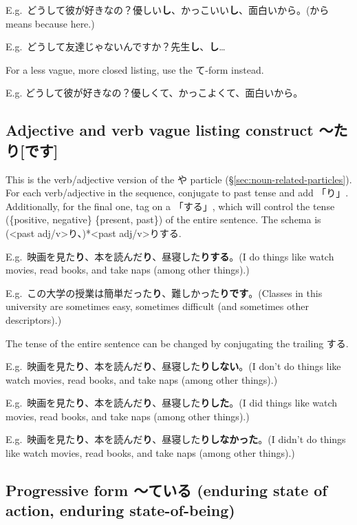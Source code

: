 \documentclass[../nihongo-gakushuu-kyouzai.tex]{subfiles}
\begin{document}
E.g.\ どうして彼が好きなの？優しい\textbf{し}、かっこいい\textbf{し}、面白いから。(から means because here.)


E.g.\ どうして友達じゃないんですか？先生\textbf{し}、\textbf{し}\dots

For a less vague, more closed listing, use the て-form instead.

E.g. どうして彼が好きなの？優しくて、かっこよくて、面白いから。

\subsection{Adjective and verb vague listing construct 〜たり[です]} \label{sec:adj-verb-vague-listing-construct}
This is the verb/adjective version of the や particle (\S\ref{sec:noun-related-particles}). For each verb/adjective in the sequence, conjugate to past tense and add 「り」. Additionally, for the final one, tag on a 「する」, which will control the tense (\{positive, negative\} \times \{present, past\}) of the entire sentence. The schema is (<past adj/v>り、)*<past adj/v>りする.

E.g.\ 映画を見た\textbf{り}、本を読んだ\textbf{り}、昼寝した\textbf{りする}。(I do things like watch movies, read books, and take naps (among other things).)

E.g.\ この大学の授業は簡単だった\textbf{り}、難しかった\textbf{りです}。(Classes in this university are sometimes easy, sometimes difficult (and sometimes other descriptors).)

The tense of the entire sentence can be changed by conjugating the trailing する.

E.g.\ 映画を見た\textbf{り}、本を読んだ\textbf{り}、昼寝した\textbf{りしない}。(I don't do things like watch movies, read books, and take naps (among other things).)

E.g.\ 映画を見た\textbf{り}、本を読んだ\textbf{り}、昼寝した\textbf{りした}。(I did things like watch movies, read books, and take naps (among other things).)

E.g.\ 映画を見た\textbf{り}、本を読んだ\textbf{り}、昼寝した\textbf{りしなかった}。(I didn't do things like watch movies, read books, and take naps (among other things).)


\subsection{Progressive form 〜ている (enduring state of action, enduring state-of-being)} \label{sec:progressive-form}
\end{document}
